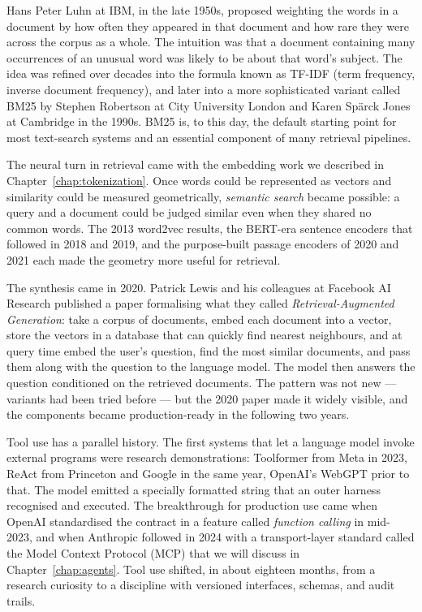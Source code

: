 Hans Peter Luhn at IBM, in the late 1950s, proposed weighting
the words in a document by how often they appeared in that
document and how rare they were across the corpus as a whole.
The intuition was that a document containing many occurrences
of an unusual word was likely to be about that word's subject.
The idea was refined over decades into the formula known as
TF-IDF (term frequency, inverse document frequency), and
later into a more sophisticated variant called BM25 by Stephen
Robertson at City University London and Karen Sp\"arck Jones at
Cambridge in the 1990s.
BM25 is, to this day, the default starting point for most
text-search systems and an essential component of many
retrieval pipelines.

The neural turn in retrieval came with the embedding work we
described in Chapter~\ref{chap:tokenization}. Once words could be represented as
vectors and similarity could be measured geometrically,
\emph{semantic search} became possible: a query and a
document could be judged similar even when they shared no
common words. The 2013 word2vec results, the BERT-era
sentence encoders that followed in 2018 and 2019, and the
purpose-built passage encoders of 2020 and 2021 each made the
geometry more useful for retrieval.

The synthesis came in 2020. Patrick Lewis and his colleagues
at Facebook AI Research published a paper formalising what
they called \emph{Retrieval-Augmented Generation}: take a
corpus of documents, embed each document into a vector, store
the vectors in a database that can quickly find nearest
neighbours, and at query time embed the user's question, find
the most similar documents, and pass them along with the
question to the language model. The model then answers the
question conditioned on the retrieved documents. The pattern
was not new --- variants had been tried before --- but the
2020 paper made it widely visible, and the components became
production-ready in the following two years.

Tool use has a parallel history. The first systems that let a
language model invoke external programs were research
demonstrations: Toolformer from Meta in 2023, ReAct from
Princeton and Google in the same year, OpenAI's WebGPT prior
to that. The model emitted a specially formatted string that
an outer harness recognised and executed. The breakthrough for
production use came when OpenAI standardised the contract in
a feature called \emph{function calling} in mid-2023, and when
Anthropic followed in 2024 with a transport-layer standard
called the Model Context Protocol (MCP) that we will discuss
in Chapter~\ref{chap:agents}. Tool use shifted, in about eighteen months,
from a research curiosity to a discipline with versioned
interfaces, schemas, and audit trails.

